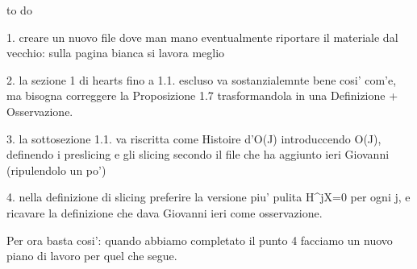 to do

1. creare un nuovo file dove man mano eventualmente riportare il materiale dal vecchio: sulla pagina bianca si lavora meglio

2. la sezione 1 di hearts fino a 1.1. escluso va sostanzialemnte bene cosi' com'e, ma bisogna correggere la Proposizione 1.7 trasformandola in una Definizione + Osservazione. 

3. la sottosezione 1.1. va riscritta come Histoire d'O(J) introduccendo O(J), definendo i preslicing e gli slicing secondo il file che ha aggiunto ieri Giovanni (ripulendolo un po')

4. nella definizione di slicing preferire la versione piu' pulita H^jX=0 per ogni j, e ricavare la definizione che dava Giovanni ieri come osservazione.

Per ora basta cosi': quando abbiamo completato il punto 4 facciamo un nuovo piano di lavoro per quel che segue.